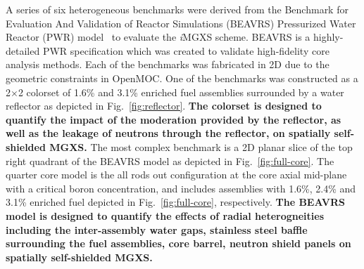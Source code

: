 \documentclass[12pt,twoside]{mitthesis-exec}
\begin{document}
A series of six heterogeneous benchmarks were derived from the Benchmark for Evaluation And Validation of Reactor Simulations (BEAVRS) Pressurized Water Reactor (PWR) model~\cite{horelik2013beavrs} to evaluate the \textit{i}MGXS scheme. BEAVRS is a highly-detailed PWR specification which was created to validate high-fidelity core analysis methods. Each of the benchmarks was fabricated in 2D due to the geometric constraints in OpenMOC. One of the benchmarks was constructed as a 2$\times$2 colorset of 1.6\% and 3.1\% enriched fuel assemblies surrounded by a water reflector as depicted in Fig.~\ref{fig:reflector}. \textbf{The colorset is designed to quantify the impact of the moderation provided by the reflector, as well as the leakage of neutrons through the reflector, on spatially self-shielded MGXS.} The most complex benchmark is a 2D planar slice of the top right quadrant of the BEAVRS model as depicted in Fig.~\ref{fig:full-core}. The quarter core model is the all rods out configuration at the core axial mid-plane with a critical boron concentration, and includes assemblies with 1.6\%, 2.4\% and 3.1\% enriched fuel depicted in Fig.~\ref{fig:full-core}, respectively. \textbf{The BEAVRS model is designed to quantify the effects of radial heterogneities including the inter-assembly water gaps, stainless steel baffle surrounding the fuel assemblies, core barrel, neutron shield panels on spatially self-shielded MGXS.} 



 

\end{document}
